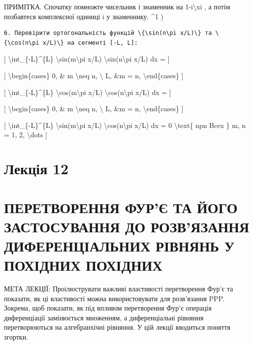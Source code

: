 \documentclass[
]{article}
\begin{document}
ПРИМІТКА. Спочатку помножте чисельник і знаменник на
1-i\textbackslash xi , а потім позбавтеся комплексної одиниці i у
знаменнику. \^{}1 )

\begin{verbatim}
6. Перевірити ортогональність функцій \{\sin(n\pi x/L)\} та \{\cos(n\pi x/L)\} на сегменті [-L, L]:
\end{verbatim}

{[} \textbackslash int\_\{-L\}\^{}\{L\}
\textbackslash sin(m\textbackslash pi x/L)
\textbackslash sin(n\textbackslash pi x/L) dx = {]}

{[} \textbackslash begin\{cases\} 0, \& m \textbackslash neq n,
\textbackslash{} L, \&m = n, \textbackslash end\{cases\} {]}

{[} \textbackslash int\_\{-L\}\^{}\{L\}
\textbackslash cos(m\textbackslash pi x/L)
\textbackslash cos(n\textbackslash pi x/L) dx = {]}

{[} \textbackslash begin\{cases\} 0, \& m \textbackslash neq n,
\textbackslash{} L, \&m = n, \textbackslash end\{cases\} {]}

{[} \textbackslash int\_\{-L\}\^{}\{L\}
\textbackslash sin(m\textbackslash pi x/L)
\textbackslash cos(n\textbackslash pi x/L) dx = 0 \textbackslash text\{
npn Bcex \} m, n = 1, 2, \textbackslash dots {]}

\section{Лекція 12}\label{ux43bux435ux43aux446ux456ux44f-12}

\section{ПЕРЕТВОРЕННЯ ФУР'Є ТА ЙОГО ЗАСТОСУВАННЯ ДО РОЗВ'ЯЗАННЯ
ДИФЕРЕНЦІАЛЬНИХ РІВНЯНЬ У ПОХІДНИХ
ПОХІДНИХ}\label{ux43fux435ux440ux435ux442ux432ux43eux440ux435ux43dux43dux44f-ux444ux443ux440ux454-ux442ux430-ux439ux43eux433ux43e-ux437ux430ux441ux442ux43eux441ux443ux432ux430ux43dux43dux44f-ux434ux43e-ux440ux43eux437ux432ux44fux437ux430ux43dux43dux44f-ux434ux438ux444ux435ux440ux435ux43dux446ux456ux430ux43bux44cux43dux438ux445-ux440ux456ux432ux43dux44fux43dux44c-ux443-ux43fux43eux445ux456ux434ux43dux438ux445-ux43fux43eux445ux456ux434ux43dux438ux445}

МЕТА ЛЕКЦІЇ: Проілюструвати важливі властивості перетворення Фур'є та
показати, як ці властивості можна використовувати для розв'язання PPP.
Зокрема, щоб показати, як під впливом перетворення Фур'є операція
диференціації замінюється множенням, а диференціальні рівняння
перетворюються на алгебранхічні рівняння. У цій лекції вводиться поняття
згортки.
\end{document}
